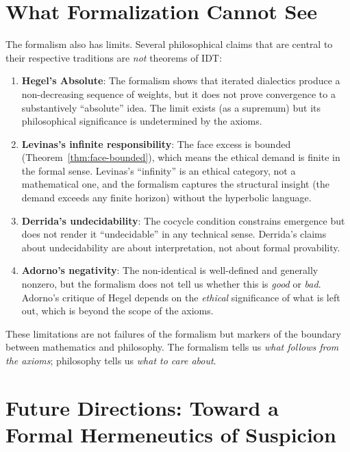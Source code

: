 \section{What Formalization Cannot See}

The formalism also has limits. Several philosophical claims that are central to
their respective traditions are \emph{not} theorems of IDT:

\begin{enumerate}
\item \textbf{Hegel's Absolute}: The formalism shows that iterated dialectics
produce a non-decreasing sequence of weights, but it does not prove convergence
to a substantively ``absolute'' idea. The limit exists (as a supremum) but its
philosophical significance is undetermined by the axioms.

\item \textbf{Levinas's infinite responsibility}: The face excess is bounded
(Theorem~\ref{thm:face-bounded}), which means the ethical demand is finite in
the formal sense. Levinas's ``infinity'' is an ethical category, not a
mathematical one, and the formalism captures the structural insight (the demand
exceeds any finite horizon) without the hyperbolic language.

\item \textbf{Derrida's undecidability}: The cocycle condition constrains
emergence but does not render it ``undecidable'' in any technical sense.
Derrida's claims about undecidability are about interpretation, not about
formal provability.

\item \textbf{Adorno's negativity}: The non-identical is well-defined and
generally nonzero, but the formalism does not tell us whether this is
\emph{good} or \emph{bad}. Adorno's critique of Hegel depends on the
\emph{ethical} significance of what is left out, which is beyond the scope
of the axioms.
\end{enumerate}

These limitations are not failures of the formalism but markers of the boundary
between mathematics and philosophy. The formalism tells us \emph{what follows
from the axioms}; philosophy tells us \emph{what to care about}.


\section{Future Directions: Toward a Formal Hermeneutics of Suspicion}
\label{sec:future-directions-philosophy}

